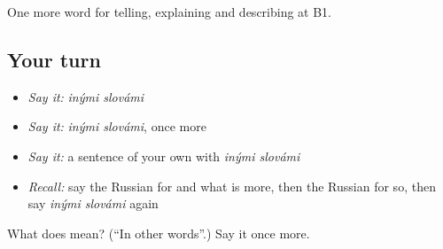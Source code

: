 \begin{grammarlens}[title={What you've built}]
One more word for telling, explaining and describing at B1.
\end{grammarlens}

\subsection*{Your turn}
\begin{itemize}
\raggedright
  \item \emph{Say it:} \emph{inými slovámi}
  \item \emph{Say it:} \emph{inými slovámi}, once more
  \item \emph{Say it:} a sentence of your own with \emph{inými slovámi}
  \item \emph{Recall:} say the Russian for and what is more, then the Russian for so, then say \emph{inými slovámi} again
\end{itemize}

\begin{tcolorbox}[breakable,colback=teal!4,colframe=teal!35!black,title={Before you move on}]
What does   mean? (\textquotedblleft{}In other words\textquotedblright{}.) Say it once more.
\end{tcolorbox}
